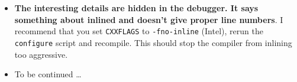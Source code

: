 \begin{itemize}
{    recognized''}. automake puts the actual executable into a \texttt{.libs}
    directory and creates bash scripts invoking those guys. Change into
    \texttt{.libs} and run gdb directly on the executable. Before you do so,
    ensure that \texttt{LD\_LIBRARY\_Path} points to the directory containing
    the libraries. Again, those guys are stored in a \texttt{.libs}
    subdirectory, so the library path should point to that subdirectory. 
  \item \textbf{The interesting details are hidden in the debugger. It says
    something about inlined and doesn't give proper line numbers}.
    I recommend that you set \texttt{CXXFLAGS} to \texttt{-fno-inline} (Intel),
    rerun the \texttt{configure} script and recompile. This should stop the
    compiler from inlining too aggressive.
  \item To be continued \dots
\end{itemize}
 
 
 
 




